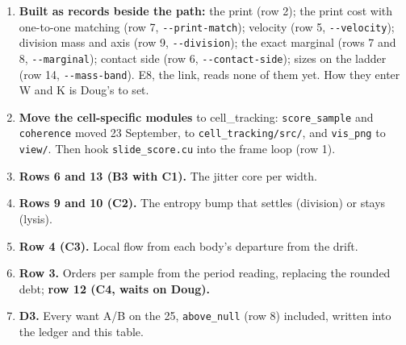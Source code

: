 \begin{enumerate}
\item \textbf{Built as records beside the path:} the print (row 2); the print cost with one-to-one matching (row 7, \texttt{-\allowbreak{}-\allowbreak{}print-\allowbreak{}match}); velocity (row 5, \texttt{-\allowbreak{}-\allowbreak{}velocity}); division mass and axis (row 9, \texttt{-\allowbreak{}-\allowbreak{}division}); the exact marginal (rows 7 and 8, \texttt{-\allowbreak{}-\allowbreak{}marginal}); contact side (row 6, \texttt{-\allowbreak{}-\allowbreak{}contact-\allowbreak{}side}); sizes on the ladder (row 14, \texttt{-\allowbreak{}-\allowbreak{}mass-\allowbreak{}band}). E8, the link, reads none of them yet. How they enter W and K is Doug's to set.
\item \textbf{Move the cell-specific modules} to cell\_\allowbreak{}tracking: \texttt{score\_\allowbreak{}sample} and \texttt{coherence} moved 23 September, to \texttt{cell\_\allowbreak{}tracking/\allowbreak{}src/\allowbreak{}}, and \texttt{vis\_\allowbreak{}png} to \texttt{view/\allowbreak{}}. Then hook \texttt{slide\_\allowbreak{}score.\allowbreak{}cu} into the frame loop (row 1).
\item \textbf{Rows 6 and 13 (B3 with C1).} The jitter core per width.
\item \textbf{Rows 9 and 10 (C2).} The entropy bump that settles (division) or stays (lysis).
\item \textbf{Row 4 (C3).} Local flow from each body's departure from the drift.
\item \textbf{Row 3.} Orders per sample from the period reading, replacing the rounded debt; \textbf{row 12 (C4, waits on Doug).}
\item \textbf{D3.} Every want A/B on the 25, \texttt{above\_\allowbreak{}null} (row 8) included, written into the ledger and this table.
\end{enumerate}
